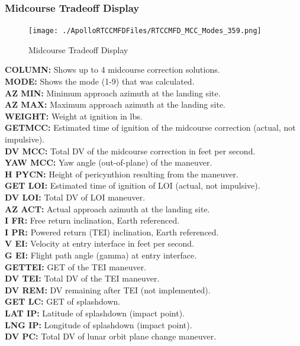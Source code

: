 \documentclass[11pt]{article} %
\begin{document}
\subsubsection{Midcourse Tradeoff Display}

\begin{figure}[h]
	\centering
		\texttt{[image: ./ApolloRTCCMFDFiles/RTCCMFD\_MCC\_Modes\_359.png]}
	\caption{Midcourse Tradeoff Display}
	\label{fig:RTCCMFD_MCC_Modes_359}
\end{figure}

\textbf{COLUMN:} Shows up to 4 midcourse correction solutions.\\
\textbf{MODE:} Shows the mode (1-9) that was calculated.\\
\textbf{AZ MIN:} Minimum approach azimuth at the landing site.\\
\textbf{AZ MAX:} Maximum approach azimuth at the landing site.\\
\textbf{WEIGHT:} Weight at ignition in lbs.\\
\textbf{GETMCC:} Estimated time of ignition of the midcourse correction (actual, not impulsive).\\
\textbf{DV MCC:} Total DV of the midcourse correction in feet per second.\\
\textbf{YAW MCC:} Yaw angle (out-of-plane) of the maneuver.\\
\textbf{H PYCN:} Height of pericynthion resulting from the maneuver.\\
\textbf{GET LOI:} Estimated time of ignition of LOI (actual, not impulsive).\\
\textbf{DV LOI:} Total DV of LOI maneuver.\\
\textbf{AZ ACT:} Actual approach azimuth at the landing site.\\
\textbf{I FR:} Free return inclination, Earth referenced.\\
\textbf{I PR:} Powered return (TEI) inclination, Earth referenced.\\
\textbf{V EI:} Velocity at entry interface in feet per second.\\
\textbf{G EI:} Flight path angle (gamma) at entry interface.\\
\textbf{GETTEI:} GET of the TEI maneuver.\\
\textbf{DV TEI:} Total DV of the TEI maneuver.\\
\textbf{DV REM:} DV remaining after TEI (not implemented).\\
\textbf{GET LC:} GET of splashdown.\\
\textbf{LAT IP:} Latitude of splashdown (impact point).\\
\textbf{LNG IP:} Longitude of splashdown (impact point).\\
\textbf{DV PC:} Total DV of lunar orbit plane change maneuver.\\
\newpage
\end{document}
